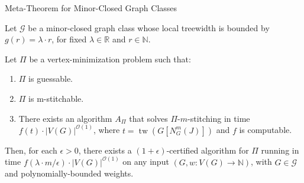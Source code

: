 \documentclass{beamer}
\newcommand{\tw}{\operatorname{tw}}
\newcommand{\backupend}{}
\begin{document}
\begin{frame}{Meta-Theorem for Minor-Closed Graph Classes}

\begin{theorem}
Let $\mathcal{G}$ be a minor-closed graph class whose local treewidth is bounded by $g(r) = \lambda \cdot r$, for fixed $\lambda \in \mathbb{R}$ and $r \in \mathbb{N}$.

Let $\Pi$ be a vertex-minimization problem such that:
\begin{enumerate}
    \item $\Pi$ is guessable.
    \item $\Pi$ is m-stitchable.
    \item There exists an algorithm $A_\Pi$ that solves $\Pi$-$m$-stitching in time 
    $f(t) \cdot |V(G)|^{\mathcal{O}(1)}$, where $t = \tw(G[N_G^m(J)])$ and $f$ is computable.
\end{enumerate}

Then, for each $\epsilon > 0$, there exists a $(1 + \epsilon)$-certified algorithm for $\Pi$ 
running in time $f(\lambda \cdot m / \epsilon) \cdot |V(G)|^{\mathcal{O}(1)}$ on any input 
$(G, w : V(G) \to \mathbb{N})$, with $G \in \mathcal{G}$ and polynomially-bounded weights.
\end{theorem}

\end{frame}

\backupend
\end{document}
